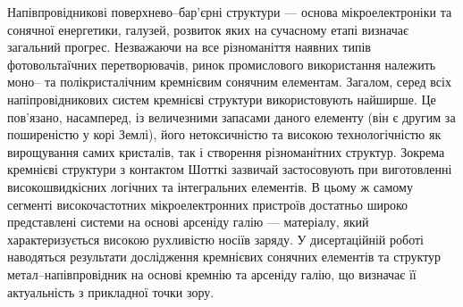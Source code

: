 %
%
%
%
%
%
%
%
%
%

{\actualityTXT}
Напівпровідникові поверхнево--бар'єрні структури --- основа мікроелектроніки та сонячної енергетики, галузей, розвиток яких на сучасному етапі визначає загальний прогрес.
Незважаючи на все різноманіття наявних типів фотовольтаїчних перетворювачів, ринок промислового використання належить моно-- та полікристалічним кремнієвим сонячним елементам.
Загалом, серед всіх напіпровідникових систем кремнієві структури використовують найширше.
Це пов'язано, насамперед, із величезними запасами даного елементу (він є другим за поширеністю у корі Землі), його нетоксичністю та високою технологічністю як вирощування самих кристалів, так і створення різноманітних структур.
Зокрема кремнієві структури з контактом Шотткі  зазвичай застосовують при виготовленні високошвидкісних логічних та інтегральних елементів.
В цьому ж самому сегменті високочастотних мікроелектронних пристроїв достатньо широко представлені системи на основі арсеніду галію --- матеріалу, який характеризується високою рухливістю носіїв заряду.
У дисертаційній роботі наводяться результати дослідження кремнієвих сонячних елементів та структур метал--напівпровідник на основі кремнію та арсеніду галію, що визначає її актуальність з прикладної точки зору.



